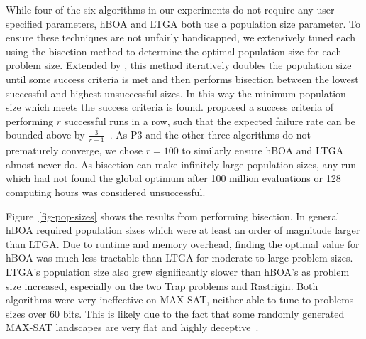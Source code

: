 While four of the six algorithms in our experiments do not require any user specified parameters,
hBOA and LTGA both use a population size parameter. To ensure these techniques are not unfairly
handicapped, we extensively tuned each using the bisection method \citep{sastry:2001:bisection}
to determine the optimal population size for each problem size.
Extended by \cite{goldman:2012:ltga}, this method iteratively
doubles the population size until some success criteria is met and then performs bisection
between the lowest successful and highest unsuccessful sizes. In this way the minimum population size
which meets the success criteria is found. \cite{goldman:2014:p3} proposed a success criteria
of performing $r$ successful runs in a row, such that the expected failure rate can be bounded
above by $\frac{3}{r+1}$~\citep{jovanovic:1997:ruleofthree}. As P3 and the other three algorithms
do not prematurely converge, we chose $r=100$ to similarly ensure hBOA and LTGA almost never do.
As bisection can make infinitely large population sizes, any run which had not found the global
optimum after 100 million evaluations or 128 computing hours was considered unsuccessful.

Figure~\ref{fig-pop-sizes} shows the results from performing bisection. In general hBOA
required population sizes which were at least an order of magnitude larger than LTGA. Due to
runtime and memory overhead, finding the optimal value for hBOA was much less tractable than LTGA
for moderate to large problem sizes. LTGA's population size also grew significantly slower
than hBOA's as problem size increased, especially on the two Trap problems and Rastrigin.
Both algorithms were very ineffective on MAX-SAT, neither able to tune to problems sizes over 60 bits.
This is likely due to the fact that some randomly generated MAX-SAT landscapes are very flat
and highly deceptive~\citep{rana:1998:gamaxsat}.
